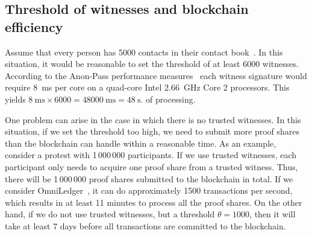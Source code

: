 


\subsection{Threshold of witnesses and blockchain efficiency}

Assume that every person has 5000 contacts in their contact book~\cite{DifficultyOfPrivateContactDiscovery}.
In this situation, it would be reasonable to set the threshold of at least 6000 witnesses.
According to the Anon-Pass performance measures~\cite{AnonPass} each witness signature would require \SI{8}{\milli\second} per core on a quad-core Intel \SI{2.66}{\giga\hertz} Core 2 processors.
This yields \(
  \SI{8}{\milli\second}\times 6000 = \SI{48000}{\milli\second} = 
  \SI{48}{\second}.
\) of processing.


One problem can arise in the case in which there is no trusted witnesses.
In this situation, if we set the threshold too high, we need to submit more proof shares than the blockchain can handle within a reasonable time.
As an example, consider a protest with 1\,000\,000 participants.
If we use trusted witnesses, each participant only needs to acquire one proof share from a trusted witness.
Thus, there will be 1\,000\,000 proof shares submitted to the blockchain in total.
If we consider OmniLedger~\cite{OmniLedger}, it can do approximately 1500 transactions per second, which results in at least 11 minutes to process all the proof shares.
On the other hand, if we do not use trusted witnesses, but a threshold \(\theta = 1000\), then it will take at least 7 days before all transactions are committed to the blockchain.


